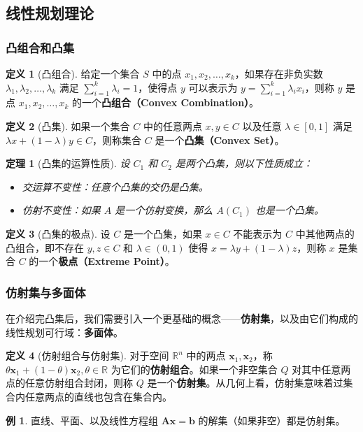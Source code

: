 \documentclass[12pt]{article}
\theoremstyle{plain}
\newtheorem{thm}{定理}[subsection]
\theoremstyle{definition}
\newtheorem{dfn}{定义}[subsection]
\newtheorem{exm}{例}[subsection]
\begin{document}
\subsection{线性规划理论}\label{subsec:lp_theory}

\subsubsection{凸组合和凸集}\label{subsubsec:convex}

\begin{dfn}[凸组合]
    给定一个集合 $S$ 中的点 $x_1, x_2, \ldots, x_k$，如果存在非负实数 $\lambda_1, \lambda_2, \ldots, \lambda_k$ 满足 $\sum_{i=1}^k \lambda_i = 1$，使得点 $y$ 可以表示为 $y = \sum_{i=1}^k \lambda_i x_i$，则称 $y$ 是点 $x_1, x_2, \ldots, x_k$ 的一个\textbf{凸组合（Convex Combination）}。
\end{dfn}

\begin{dfn}[凸集]
    如果一个集合 $C$ 中的任意两点 $x, y \in C$ 以及任意 $\lambda \in [0, 1]$ 满足 $\lambda x + (1 - \lambda) y \in C$，则称集合 $C$ 是一个\textbf{凸集（Convex Set）}。
\end{dfn}

\begin{thm}[凸集的运算性质]
    设 $C_1$ 和 $C_2$ 是两个凸集，则以下性质成立：
    \begin{itemize}
        \item 交运算不变性：任意个凸集的交仍是凸集。
        \item 仿射不变性：如果 $A$ 是一个仿射变换，那么 $A(C_1)$ 也是一个凸集。
    \end{itemize}
\end{thm}

\begin{dfn}[凸集的极点]
    设 $C$ 是一个凸集，如果 $x \in C$ 不能表示为 $C$ 中其他两点的凸组合，即不存在 $y, z \in C$ 和 $\lambda \in (0, 1)$ 使得 $x = \lambda y + (1 - \lambda) z$，则称 $x$ 是集合 $C$ 的一个\textbf{极点（Extreme Point）}。
\end{dfn}

\subsubsection{仿射集与多面体}\label{subsubsec:affine_polyhedron}

在介绍完凸集后，我们需要引入一个更基础的概念——\textbf{仿射集}，以及由它们构成的线性规划可行域：\textbf{多面体}。

\begin{dfn}[仿射组合与仿射集]
    对于空间 $\mathbb{R}^n$ 中的两点 $\bm{x}_1, \bm{x}_2$，称 $\theta \bm{x}_1 + (1-\theta) \bm{x}_2, \theta \in \mathbb{R}$ 为它们的\textbf{仿射组合}。如果一个非空集合 $Q$ 对其中任意两点的任意仿射组合封闭，则称 $Q$ 是一个\textbf{仿射集}。从几何上看，仿射集意味着过集合内任意两点的直线也包含在集合内。
\end{dfn}
\begin{exm}
    直线、平面、以及线性方程组 $\bm{A}\bm{x}=\bm{b}$ 的解集（如果非空）都是仿射集。
\end{exm}
\end{document}
